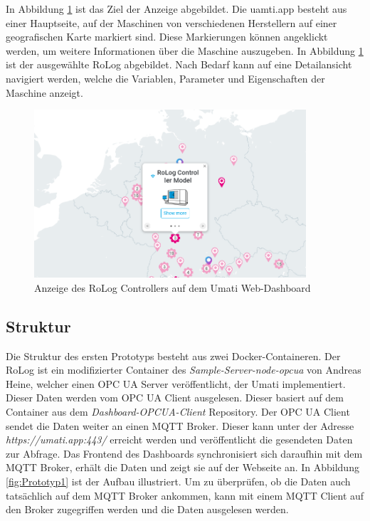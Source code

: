 \documentclass[a4paper, 12pt, oneside, toc=listofnumbered, bibliography=totoc]{scrbook}
\begin{document}
		In Abbildung \ref{fig:umatiApp} ist das Ziel der Anzeige abgebildet. Die uamti.app besteht aus einer Hauptseite, auf der Maschinen von verschiedenen Herstellern auf einer geografischen Karte markiert sind. Diese Markierungen können angeklickt werden, um weitere Informationen über die Maschine auszugeben. In Abbildung \ref{fig:umatiApp} ist der ausgewählte RoLog abgebildet. Nach Bedarf kann auf eine Detailansicht navigiert werden, welche die Variablen, Parameter und Eigenschaften der Maschine anzeigt.
		
		\begin{figure}[H]
			\centering
			\includegraphics[width=0.9\textwidth]{res/UmatiApp.png}
			\caption{Anzeige des RoLog Controllers auf dem Umati Web-Dashboard}
			\label{fig:umatiApp}
		\end{figure}
		
		\subsection{Struktur}
		
		Die Struktur des ersten Prototyps besteht aus zwei Docker-Containeren. Der RoLog ist ein modifizierter Container des \textit{Sample-Server-node-opcua} von Andreas Heine, welcher einen OPC UA Server veröffentlicht, der Umati implementiert. Dieser Daten werden vom OPC UA Client ausgelesen. Dieser basiert auf dem Container aus dem \textit{Dashboard-OPCUA-Client} Repository. Der OPC UA Client sendet die Daten weiter an einen MQTT Broker. Dieser kann unter der Adresse \textit{https://umati.app:443/} erreicht werden und veröffentlicht die gesendeten Daten zur Abfrage. Das Frontend des Dashboards synchronisiert sich daraufhin mit dem MQTT Broker, erhält die Daten und zeigt sie auf der Webseite an. In Abbildung \ref{fig:Prototyp1} ist der Aufbau illustriert. Um zu überprüfen, ob die Daten auch tatsächlich auf dem MQTT Broker ankommen, kann mit einem MQTT Client auf den Broker zugegriffen werden und die Daten ausgelesen werden.
		
\end{document}
